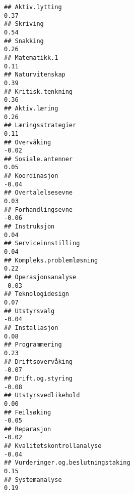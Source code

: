 \documentclass[
]{article}
\begin{document}
\begin{verbatim}
## Aktiv.lytting                                                                     0.37
## Skriving                                                                          0.54
## Snakking                                                                          0.26
## Matematikk.1                                                                      0.11
## Naturvitenskap                                                                    0.39
## Kritisk.tenkning                                                                  0.36
## Aktiv.læring                                                                      0.26
## Læringsstrategier                                                                 0.11
## Overvåking                                                                       -0.02
## Sosiale.antenner                                                                  0.05
## Koordinasjon                                                                     -0.04
## Overtalelsesevne                                                                  0.03
## Forhandlingsevne                                                                 -0.06
## Instruksjon                                                                       0.04
## Serviceinnstilling                                                                0.04
## Kompleks.problemløsning                                                           0.22
## Operasjonsanalyse                                                                -0.03
## Teknologidesign                                                                   0.07
## Utstyrsvalg                                                                      -0.04
## Installasjon                                                                      0.08
## Programmering                                                                     0.23
## Driftsovervåking                                                                 -0.07
## Drift.og.styring                                                                 -0.08
## Utstyrsvedlikehold                                                                0.00
## Feilsøking                                                                       -0.05
## Reparasjon                                                                       -0.02
## Kvalitetskontrollanalyse                                                         -0.04
## Vurderinger.og.beslutningstaking                                                  0.15
## Systemanalyse                                                                     0.19

\end{verbatim}
\end{document}
